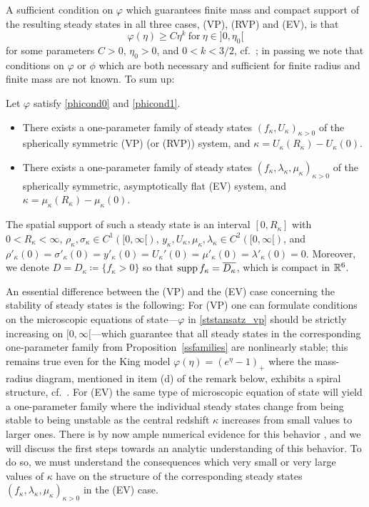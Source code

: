 \documentclass[11pt]{article}
\begin{document}
A sufficient condition on $\varphi$ which guarantees finite mass and compact
support of the resulting steady states in all three cases,
(VP), (RVP) and (EV), is that
\begin{equation} \label{phicond1}
  \varphi(\eta) \geq C \eta^k \ \mbox{for}\ \eta \in ]0,\eta_0[
\end{equation}
for some parameters $C>0$, $\eta_0>0$, and $0<k<3/2$, cf.~\cite{RaRe};
in passing we note that conditions on $\varphi$ or $\phi$ which are both
necessary and sufficient for finite radius and finite mass are
not known. To sum up:
%
%
\begin{proposition} \label{ssfamilies}
  Let $\varphi$ satisfy \eqref{phicond0} and \eqref{phicond1}.
  \begin{itemize}
  \item[(a)]
    There exists a one-parameter family of steady states
     $(f_{\kappa},U_{\kappa})_{\kappa >0}$
    of the spherically symmetric (VP) (or (RVP)) system,
    and $\kappa = U_\kappa(R_\kappa) - U_\kappa(0)$.
  \item[(b)]
    There exists a one-parameter family of steady states
     $(f_{\kappa},\lambda_{\kappa},\mu_{\kappa})_{\kappa >0}$
     of the spherically symmetric, asymptotically flat
     (EV) system, and
     $\kappa = \mu_\kappa(R_\kappa) - \mu_\kappa(0)$.
  \end{itemize}
  The spatial support of such a steady state is an interval
  $[0,R_\kappa]$ with $0<R_\kappa<\infty$,
  $\rho_\kappa, \sigma_\kappa \in C^1([0,\infty[)$,
  $y_\kappa, U_\kappa, \mu_\kappa, \lambda_\kappa  \in C^2([0,\infty[)$, and
  $\rho'_\kappa(0)=\sigma'_\kappa(0)= y'_\kappa(0) = U_\kappa'(0) = \mu'_\kappa(0)
  = \lambda'_\kappa(0)=0$. Moreover, we denote
  $D=D_\kappa \coloneqq \{ f_\kappa >0\}$ so that $\mathrm{supp}\, f_\kappa = \overline{D_\kappa}$,
  which is compact in $\mathbb R^6$.
\end{proposition}
%
%
An essential difference between the (VP) and the (EV) case concerning
the stability of steady states is the following: For (VP) one can formulate
conditions on the microscopic equations of state---$\varphi$
in \eqref{ststansatz_vp} should be strictly increasing on
$[0,\infty[$---which guarantee
that all steady states in the corresponding one-parameter family from
Proposition~\ref{ssfamilies} are nonlinearly stable; this remains true
even for the King model $\varphi(\eta)=(e^\eta-1)_+$ where the mass-radius
diagram, mentioned in item (d) of the remark below,
exhibits a spiral structure, cf.~\cite{GuRe2007}.
For (EV) the same type of microscopic equation of state
will yield a one-parameter family where the individual steady states
change from being stable to being unstable as the central redshift
$\kappa$ increases from small values to larger ones. There is by now ample
numerical evidence for this behavior \cite{AnRe1,Gue_e_a,GueStRe21},
and we will discuss the first steps towards an analytic
understanding of this behavior. To do so, we must understand the
consequences which very small or very large values of $\kappa$
have on the structure of the corresponding steady states
$(f_{\kappa},\lambda_{\kappa},\mu_{\kappa})_{\kappa >0}$ in the (EV) case.
\end{document}

